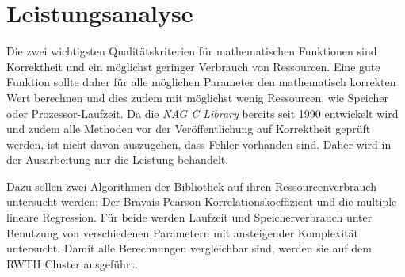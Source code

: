 \documentclass{article}
\begin{document}
\section{Leistungsanalyse}

Die zwei wichtigsten Qualitätskriterien für mathematischen Funktionen sind Korrektheit und ein möglichst geringer Verbrauch von Ressourcen.
Eine gute Funktion sollte daher für alle möglichen Parameter den mathematisch korrekten Wert berechnen und dies zudem mit möglichst wenig Ressourcen, wie Speicher oder Prozessor-Laufzeit.
Da die {\it NAG C Library} bereits seit 1990 entwickelt wird\cite{Wikipedia:nag} und zudem alle Methoden vor der Veröffentlichung auf Korrektheit geprüft werden\cite{NAG2011}, ist nicht davon auszugehen, dass Fehler vorhanden sind.
Daher wird in der Ausarbeitung nur die Leistung behandelt.

Dazu sollen zwei Algorithmen der Bibliothek auf ihren Ressourcenverbrauch untersucht werden: Der Bravais-Pearson Korrelationskoeffizient und die multiple lineare Regression.
Für beide werden Laufzeit und Speicherverbrauch unter Benutzung von verschiedenen Parametern mit ansteigender Komplexität untersucht.
Damit alle Berechnungen vergleichbar sind, werden sie auf dem RWTH Cluster ausgeführt.




\end{document}
